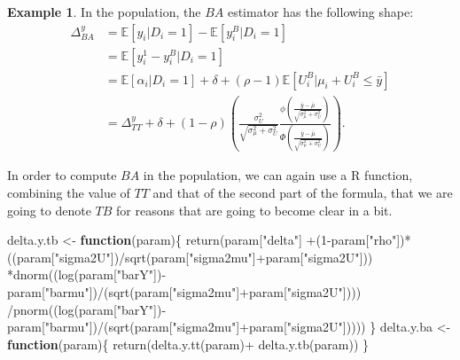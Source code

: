 \documentclass[
]{book}
\newenvironment{Shaded}{\begin{snugshade}}{\end{snugshade}}
\newcommand{\ControlFlowTok}[1]{\textcolor[rgb]{0.13,0.29,0.53}{\textbf{#1}}}
\newcommand{\DecValTok}[1]{\textcolor[rgb]{0.00,0.00,0.81}{#1}}
\newcommand{\FunctionTok}[1]{\textcolor[rgb]{0.00,0.00,0.00}{#1}}
\newcommand{\NormalTok}[1]{#1}
\newcommand{\OtherTok}[1]{\textcolor[rgb]{0.56,0.35,0.01}{#1}}
\newcommand{\SpecialCharTok}[1]{\textcolor[rgb]{0.00,0.00,0.00}{#1}}
\newcommand{\StringTok}[1]{\textcolor[rgb]{0.31,0.60,0.02}{#1}}
\newcommand{\esp}[1]{\mathbb{E}[ #1 ]}
\theoremstyle{definition}
\theoremstyle{definition}
\newtheorem{example}{Example}[chapter]
\theoremstyle{definition}
\theoremstyle{definition}
\theoremstyle{remark}
\begin{document}
\begin{example}
\protect\hypertarget{exm:unnamed-chunk-25}{}{\label{exm:unnamed-chunk-25} }In the population, the \(BA\) estimator has the following shape:
\begin{align*}
  \Delta^y_{BA} & = \esp{y_i|D_i=1}-\esp{y^B_i|D_i=1}\\
                & = \esp{y^1_i-y^B_i|D_i=1}\\
                & = \esp{\alpha_i|D_i=1} + \delta + (\rho-1)\esp{U_i^B|\mu_i+U_i^B\leq\bar{y}}\\
                & = \Delta^y_{TT} + \delta + (1-\rho)\left(\frac{\sigma^2_{U}}{\sqrt{\sigma^2_{\mu}+\sigma^2_{U}}}\frac{\phi\left(\frac{\bar{y}-\bar{\mu}}{\sqrt{\sigma^2_{\mu}+\sigma^2_{U}}}\right)}{\Phi\left(\frac{\bar{y}-\bar{\mu}}{\sqrt{\sigma^2_{\mu}+\sigma^2_{U}}}\right)}\right).
\end{align*}
\end{example}

In order to compute \(BA\) in the population, we can again use a R function, combining the value of \(TT\) and that of the second part of the formula, that we are going to denote \(TB\) for reasons that are going to become clear in a bit.

\begin{Shaded}
\begin{Highlighting}[]
\NormalTok{delta.y.tb }\OtherTok{\textless{}{-}} \ControlFlowTok{function}\NormalTok{(param)\{}
  \FunctionTok{return}\NormalTok{(param[}\StringTok{"delta"}\NormalTok{]}
          \SpecialCharTok{+}\NormalTok{(}\DecValTok{1}\SpecialCharTok{{-}}\NormalTok{param[}\StringTok{"rho"}\NormalTok{])}\SpecialCharTok{*}\NormalTok{((param[}\StringTok{"sigma2U"}\NormalTok{])}\SpecialCharTok{/}\FunctionTok{sqrt}\NormalTok{(param[}\StringTok{"sigma2mu"}\NormalTok{]}\SpecialCharTok{+}\NormalTok{param[}\StringTok{"sigma2U"}\NormalTok{]))}
         \SpecialCharTok{*}\FunctionTok{dnorm}\NormalTok{((}\FunctionTok{log}\NormalTok{(param[}\StringTok{"barY"}\NormalTok{])}\SpecialCharTok{{-}}\NormalTok{param[}\StringTok{"barmu"}\NormalTok{])}\SpecialCharTok{/}\NormalTok{(}\FunctionTok{sqrt}\NormalTok{(param[}\StringTok{"sigma2mu"}\NormalTok{]}\SpecialCharTok{+}\NormalTok{param[}\StringTok{"sigma2U"}\NormalTok{])))}
         \SpecialCharTok{/}\FunctionTok{pnorm}\NormalTok{((}\FunctionTok{log}\NormalTok{(param[}\StringTok{"barY"}\NormalTok{])}\SpecialCharTok{{-}}\NormalTok{param[}\StringTok{"barmu"}\NormalTok{])}\SpecialCharTok{/}\NormalTok{(}\FunctionTok{sqrt}\NormalTok{(param[}\StringTok{"sigma2mu"}\NormalTok{]}\SpecialCharTok{+}\NormalTok{param[}\StringTok{"sigma2U"}\NormalTok{]))))}
\NormalTok{\}}
\NormalTok{delta.y.ba }\OtherTok{\textless{}{-}} \ControlFlowTok{function}\NormalTok{(param)\{}
  \FunctionTok{return}\NormalTok{(}\FunctionTok{delta.y.tt}\NormalTok{(param)}\SpecialCharTok{+} \FunctionTok{delta.y.tb}\NormalTok{(param))}
\NormalTok{\}}
\end{Highlighting}
\end{Shaded}
\end{document}
